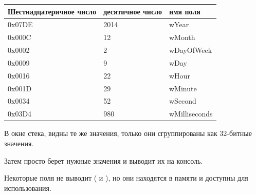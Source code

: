 \begin{center}
\begin{tabular}{ | l | l | l | }
\hline
\headercolor{} Шестнадцатеричное число & 
\headercolor{} десятичное число & 
\headercolor{} имя поля \\
\hline
0x07DE & 2014	& wYear \\
\hline
0x000C & 12	& wMonth \\
\hline
0x0002 & 2	& wDayOfWeek \\
\hline
0x0009 & 9	& wDay \\
\hline
0x0016 & 22	& wHour \\
\hline
0x001D & 29	& wMinute \\
\hline
0x0034 & 52	& wSecond \\
\hline	
0x03D4 & 980	& wMilliseconds \\
\hline
\end{tabular}
\end{center}

В окне стека, видны те же значения, только они сгруппированы как 32-битные значения.

Затем \printf просто берет нужные значения и выводит их на консоль.

Некоторые поля \printf не выводит ( и
), но они находятся в памяти и доступны для использования.

